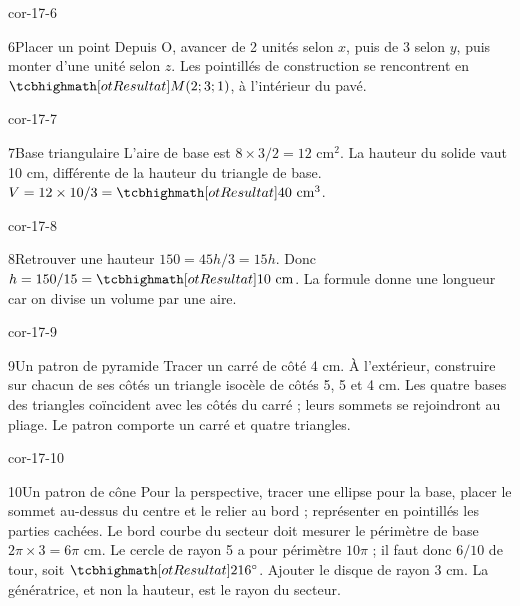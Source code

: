 \begin{blocLivre}{cor-17-6}\begin{corrige}{6}{Placer un point}
Depuis O, avancer de 2 unités selon $x$, puis de 3 selon $y$, puis monter d’une unité selon $z$. Les pointillés de construction se rencontrent en $\res{M(2;3;1)}$, à l’intérieur du pavé.
\label{fig-cor-17-6}
\end{corrige}\end{blocLivre}
\begin{blocLivre}{cor-17-7}\begin{corrige}{7}{Base triangulaire}
L’aire de base est $8\times3/2=12$ cm$^2$. La hauteur du solide vaut 10 cm, différente de la hauteur du triangle de base. $V=12\times10/3=\res{40\ \mathrm{cm}^3}$.
\label{fig-cor-17-7}
\end{corrige}\end{blocLivre}
\begin{blocLivre}{cor-17-8}\begin{corrige}{8}{Retrouver une hauteur}
$150=45h/3=15h$. Donc $h=150/15=\res{10\ \mathrm{cm}}$. La formule donne une longueur car on divise un volume par une aire.
\label{fig-cor-17-8}
\end{corrige}\end{blocLivre}
\begin{blocLivre}{cor-17-9}\begin{corrige}{9}{Un patron de pyramide}
Tracer un carré de côté 4 cm. À l’extérieur, construire sur chacun de ses côtés un triangle isocèle de côtés 5, 5 et 4 cm. Les quatre bases des triangles coïncident avec les côtés du carré ; leurs sommets se rejoindront au pliage. Le patron comporte un carré et quatre triangles.
\label{fig-cor-17-9}
\end{corrige}\end{blocLivre}
\begin{blocLivre}{cor-17-10}\begin{corrige}{10}{Un patron de cône}
Pour la perspective, tracer une ellipse pour la base, placer le sommet au-dessus du centre et le relier au bord ; représenter en pointillés les parties cachées. Le bord courbe du secteur doit mesurer le périmètre de base $2\pi\times3=6\pi$ cm. Le cercle de rayon 5 a pour périmètre $10\pi$ ; il faut donc $6/10$ de tour, soit $\res{216^\circ}$. Ajouter le disque de rayon 3 cm. La génératrice, et non la hauteur, est le rayon du secteur.
\label{fig-cor-17-10}
\end{corrige}\end{blocLivre}

